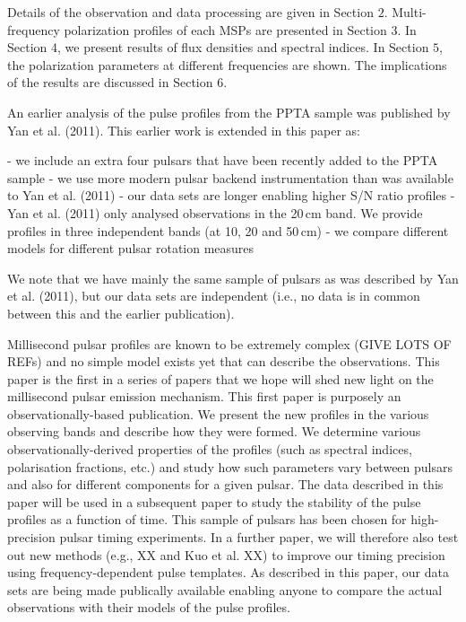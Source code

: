 \documentclass[useAMS,usenatbib]{mn2e}
\begin{document}
Details of the observation and data processing are given in Section $2$. 
Multi-frequency polarization profiles of each MSPs are presented in Section 
$3$.
%
In Section $4$, we present results of flux densities and spectral indices.
%
In Section $5$, the polarization parameters at different frequencies are 
shown.
%
The implications of the results are discussed in Section $6$.



An earlier analysis of the pulse profiles from the PPTA sample was published by Yan et al. (2011).  This earlier work is extended in this paper as:

- we include an extra four pulsars that have been recently added to the PPTA sample
- we use more modern pulsar backend instrumentation than was available to Yan et al. (2011)
	- our data sets are longer enabling higher S/N ratio profiles
	- Yan et al. (2011) only analysed observations in the 20\,cm band.  We provide profiles in three independent bands (at 10, 20 and 50\,cm)
	- we compare different models for different pulsar rotation measures

	We note that we have mainly the same sample of pulsars as was described by Yan et al. (2011), but our data sets are independent (i.e., no data is in common between this and the earlier publication).


	 Millisecond pulsar profiles are known to be extremely complex (GIVE LOTS OF REFs) and no simple model exists yet that can describe the observations.  This paper is the first in a series of papers that we hope will shed new light on the millisecond pulsar emission mechanism. This first paper is purposely an observationally-based publication.  We present the new profiles in the various observing bands and describe how they were formed.  We determine various observationally-derived properties of the profiles (such as spectral indices, polarisation fractions, etc.) and study how such parameters vary between pulsars and also for different components for a given pulsar.   The data described in this paper will be used in a subsequent paper to study the stability of the pulse profiles as a function of time.  This sample of pulsars has been chosen for high-precision pulsar timing experiments. In a further paper, we will therefore also test out new methods (e.g., XX and Kuo et al. XX) to improve our timing precision using frequency-dependent pulse templates.  As described in this paper, our data sets are being made publically available enabling anyone to compare the actual observations with their models of the pulse profiles.
\end{document}

